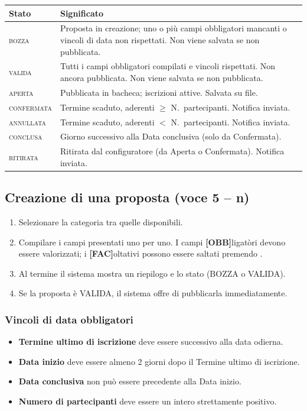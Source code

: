 \documentclass[12pt,a4paper,oneside]{report}
\newcommand{\tasto}[1]{\fbox{\small\ttfamily#1}}
\begin{document}
\begin{center}
\begin{tabular}{L{3cm}L{10cm}}
\toprule
\textbf{Stato} & \textbf{Significato} \\
\midrule
\textsc{bozza}     & Proposta in creazione; uno o più campi obbligatori mancanti o vincoli di data non rispettati. Non viene salvata se non pubblicata. \\
\textsc{valida}    & Tutti i campi obbligatori compilati e vincoli rispettati. Non ancora pubblicata. Non viene salvata se non pubblicata. \\
\textsc{aperta}    & Pubblicata in bacheca; iscrizioni attive. Salvata su file. \\
\textsc{confermata}& Termine scaduto, aderenti $\geq$ N.\ partecipanti. Notifica inviata. \\
\textsc{annullata} & Termine scaduto, aderenti $<$ N.\ partecipanti. Notifica inviata. \\
\textsc{conclusa}  & Giorno successivo alla Data conclusiva (solo da Confermata). \\
\textsc{ritirata}  & Ritirata dal configuratore (da Aperta o Confermata). Notifica inviata. \\
\bottomrule
\end{tabular}
\end{center}

\subsection{Creazione di una proposta (voce 5 -- n)}
\begin{enumerate}
  \item Selezionare la categoria tra quelle disponibili.
  \item Compilare i campi presentati uno per uno. I campi \textbf{[OBB]}ligatòri devono essere valorizzati; i \textbf{[FAC]}oltativi possono essere saltati premendo \tasto{INVIO}.
  \item Al termine il sistema mostra un riepilogo e lo stato (BOZZA o VALIDA).
  \item Se la proposta è VALIDA, il sistema offre di pubblicarla immediatamente.
\end{enumerate}

\subsubsection{Vincoli di data obbligatori}
\begin{itemize}
  \item \textbf{Termine ultimo di iscrizione} deve essere successivo alla data odierna.
  \item \textbf{Data inizio} deve essere almeno 2 giorni dopo il Termine ultimo di iscrizione.
  \item \textbf{Data conclusiva} non può essere precedente alla Data inizio.
  \item \textbf{Numero di partecipanti} deve essere un intero strettamente positivo.
\end{itemize}
\end{document}
